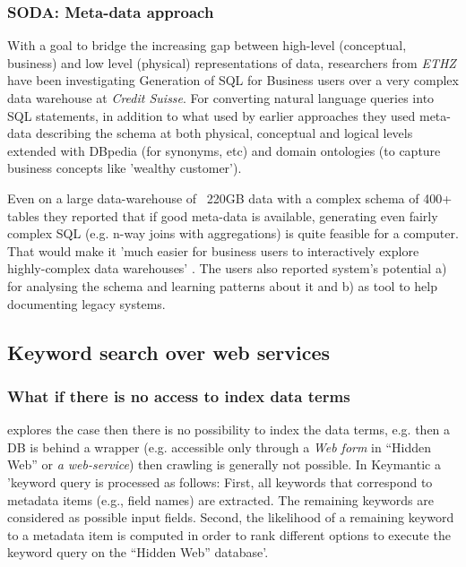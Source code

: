 \subsubsection*{SODA: Meta-data approach}

With a goal to bridge the increasing gap between high-level (conceptual, business) and low level (physical) representations of data, researchers from \textit{ETHZ} have been investigating Generation of SQL for Business users over a very complex data warehouse at \textit{Credit Suisse}.  For converting natural language queries 
 into SQL statements, in addition to what used by earlier approaches they used meta-data describing the schema at both physical, conceptual and logical levels extended with DBpedia (for synonyms, etc) and domain ontologies (to capture business concepts like 'wealthy customer').

Even on a large data-warehouse of ~220GB data with a complex schema of 400+ tables they reported that if good meta-data is available, generating even fairly complex SQL  (e.g. n-way joins with aggregations) is quite feasible for a computer. That would make it 'much easier for business users to interactively explore highly-complex data warehouses' \cite[p.932]{ethz2012}. The users also reported system's potential a) for analysing the schema and learning patterns about it and b) as tool to help documenting legacy systems.


\subsection{Keyword search over web services}


\subsubsection*{What if there is no access to index data terms}
\cite{Keymantic10, semantics_without_access} explores the case then there is no possibility to index the data terms, e.g. then a DB is behind a wrapper (e.g. accessible only through a \textit{Web form} in “Hidden Web” or \textit{a web-service}) then crawling is generally not possible.
%
In Keymantic\cite{Keymantic10} a 'keyword query is processed as follows: First, all keywords that  correspond to metadata items (e.g., field names) are extracted. The remaining
keywords are considered as possible input fields. Second, the likelihood of a remaining keyword to a metadata item is computed in order to rank different options to execute the keyword query on the
“Hidden Web” database'\cite[p.942]{ethz2012}.

